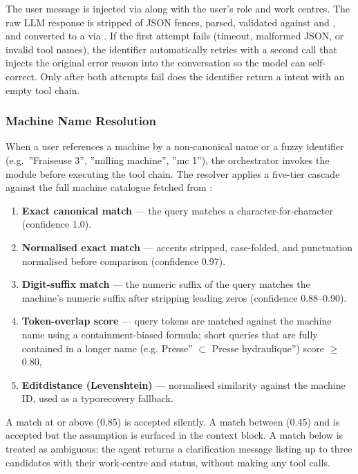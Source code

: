 The user message is injected 
via  along with the
user's role and work centres. The raw LLM response is stripped of JSON fences,
parsed, validated against  and , and
converted to a  via . 
If the first attempt fails (timeout, malformed JSON, or invalid tool names),
the identifier automatically retries with a second  call
that injects the original error reason into the conversation so the model
can self-correct. Only after both attempts fail does the identifier return
a  intent with an empty tool chain.

\subsubsection*{Machine Name Resolution}
When a user references a machine by a non-canonical name or a fuzzy
identifier (e.g.\ ''Fraiseuse 3'', ''milling machine'', ''mc 1''),
the orchestrator invokes the  module before
executing the tool chain. The resolver applies a five-tier cascade
against the full machine catalogue fetched from :

\begin{enumerate}[noitemsep, topsep=4pt, leftmargin=*]
	\item \textbf{Exact canonical match} --- the query matches a
	 character-for-character (confidence 1.0).
	\item \textbf{Normalised exact match} --- accents stripped,
	case-folded, and punctuation normalised before comparison
	(confidence 0.97).
	\item \textbf{Digit-suffix match} --- the numeric suffix of the query
	matches the machine's numeric suffix after stripping leading zeros
	(confidence 0.88--0.90).
	\item \textbf{Token-overlap score} --- query tokens are matched against
	the machine name using a containment-biased formula; short
	queries that are fully contained in a longer name (e.g.
	Presse'' $\subset$ Presse hydraulique'') score  $\geq$ 0.80,
	\item \textbf{Edit\-distance (Levenshtein)} --- normalised similarity
	against the machine ID, used as a typo\-recovery fallback.
\end{enumerate}
A match at or above  (0.85) is accepted
silently. A match between  (0.45) and
 is accepted but the assumption is surfaced
in the  context block. A match below
 is treated as ambiguous: the agent returns
a clarification message listing up to three candidates with their
work-centre and status, without making any tool calls.

